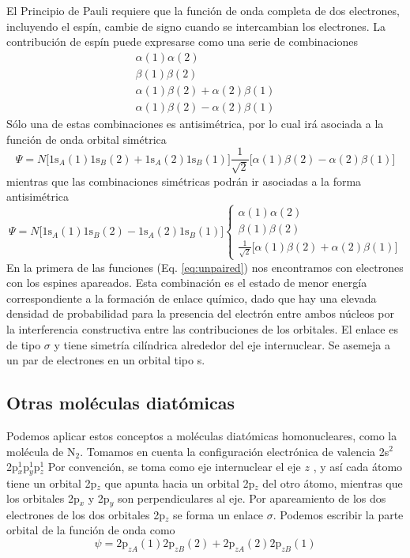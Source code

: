 \documentclass{tufte-handout}
\begin{document}
El Principio de Pauli requiere que la función de onda completa de dos electrones, 
incluyendo el espín, cambie de signo cuando se intercambian 
los electrones. La contribución de espín puede expresarse
como una serie de combinaciones 
\begin{gather*}
\alpha(1)\alpha(2)\\
\beta (1)\beta (2)\\
\alpha(1)\beta(2) + \alpha(2)\beta(1)\\
\alpha(1)\beta(2) - \alpha(2)\beta(1)
\end{gather*}
Sólo una de estas combinaciones es antisimétrica, por lo cual
irá asociada a la función de onda orbital simétrica
\begin{equation}
    \Psi=N
    \big[\mathrm{1s}_A(1)\mathrm{1s}_B(2) +\mathrm{1s}_A(2)\mathrm{1s}_B(1)\big]
    \frac{1}{\sqrt{2}}\big[\alpha(1)\beta(2) - \alpha(2)\beta(1)\big]
    \label{eq:unpaired}
\end{equation}
mientras que las combinaciones simétricas podrán ir asociadas
a la forma antisimétrica
\begin{equation}
    \Psi=N
    \big[\mathrm{1s}_A(1)\mathrm{1s}_B(2) -\mathrm{1s}_A(2)\mathrm{1s}_B(1)\big]
\begin{cases}
\alpha(1)\alpha(2)\\
\beta (1)\beta (2)\\ 
\frac{1}{\sqrt{2}}\big[\alpha(1)\beta(2) + \alpha(2)\beta(1)\big]
\end{cases}
\end{equation}
En la primera de las funciones (Eq. \ref{eq:unpaired})
nos encontramos con electrones con los espines apareados.
Esta combinación es el estado de menor energía
correspondiente a la formación de enlace químico,
dado que hay una elevada densidad de 
probabilidad para la presencia del electrón entre ambos
núcleos por la interferencia constructiva entre las
contribuciones de los orbitales. El enlace es de tipo 
$\sigma$ y tiene simetría cilíndrica alrededor del eje
internuclear. Se asemeja a un par de electrones en 
un orbital tipo s.

\subsection{Otras moléculas diatómicas}
Podemos aplicar estos conceptos a moléculas diatómicas
homonucleares, como la molécula de N$_2$. Tomamos en 
cuenta la configuración electrónica de valencia
2s$^2$2p$_x^1$p$_y^1$p$_z^1$
Por convención, se toma como eje internuclear el eje $z$ ,
y así cada átomo tiene un orbital 2p$_z$ que apunta 
hacia un orbital 2p$_z$ del otro átomo, mientras que 
los orbitales 2p$_x$ y 2p$_y$ son perpendiculares al eje. 
Por apareamiento de los dos electrones de los dos orbitales 
2p$_z$ se forma un enlace $\sigma$. Podemos escribir la
parte orbital de la función de onda como
\begin{equation}
 \psi =2\mathrm{p}_{zA}(1)2\mathrm{p}_{zB}(2) + 2\mathrm{p}_{zA}(2)2\mathrm{p}_{zB}(1)
\end{equation} 
\end{document}
